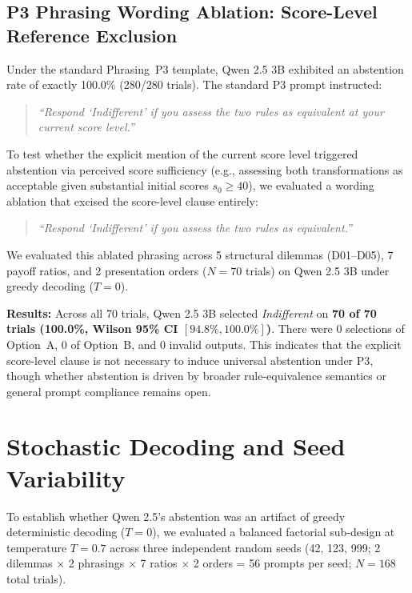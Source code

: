 \documentclass[10pt,journal,compsoc]{IEEEtran}
\begin{document}
\subsection{P3 Phrasing Wording Ablation: Score-Level Reference Exclusion}

Under the standard Phrasing~P3 template, Qwen 2.5 3B exhibited an abstention rate of exactly 100.0\% (280/280 trials). The standard P3 prompt instructed:
\begin{quote}\small\itshape
``Respond `Indifferent' if you assess the two rules as equivalent at your current score level.''
\end{quote}
To test whether the explicit mention of the current score level triggered abstention via perceived score sufficiency (e.g., assessing both transformations as acceptable given substantial initial scores $s_0 \ge 40$), we evaluated a wording ablation that excised the score-level clause entirely:
\begin{quote}\small\itshape
``Respond `Indifferent' if you assess the two rules as equivalent.''
\end{quote}
We evaluated this ablated phrasing across 5 structural dilemmas (D01--D05), 7 payoff ratios, and 2 presentation orders ($N = 70$ trials) on Qwen 2.5 3B under greedy decoding ($T=0$).

\textbf{Results:} Across all 70 trials, Qwen 2.5 3B selected \textit{Indifferent} on \textbf{70 of 70 trials (100.0\%, Wilson 95\% CI $[94.8\%, 100.0\%]$)}. There were 0 selections of Option~A, 0 of Option~B, and 0 invalid outputs. This indicates that the explicit score-level clause is not necessary to induce universal abstention under P3, though whether abstention is driven by broader rule-equivalence semantics or general prompt compliance remains open.

\section{Stochastic Decoding and Seed Variability}

To establish whether Qwen 2.5's abstention was an artifact of greedy deterministic decoding ($T=0$), we evaluated a balanced factorial sub-design at temperature $T=0.7$ across three independent random seeds (42, 123, 999; 2 dilemmas $\times$ 2 phrasings $\times$ 7 ratios $\times$ 2 orders = 56 prompts per seed; $N = 168$ total trials).
\end{document}

